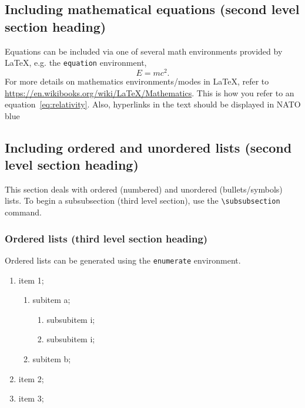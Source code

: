 \documentclass{nato-sto}
\begin{document}
\subsection{Including mathematical equations (second level section heading)	}

Equations can be included via one of several math environments provided by \LaTeX, e.g. the \verb|equation| environment,
\begin{equation}\label{eq:relativity}
E = mc^2.
\end{equation}
For more details on mathematics environments/modes in \LaTeX, refer to \url{https://en.wikibooks.org/wiki/LaTeX/Mathematics}. This is how you refer to an equation~\eqref{eq:relativity}. Also, hyperlinks in the text should be displayed in NATO blue 


\subsection{Including ordered and unordered lists (second level section heading)}

This section deals with ordered (numbered) and unordered (bullets/symbols) lists. To begin a subsubsection (third level section), use the \verb|\subsubsection| command.

\subsubsection{Ordered lists (third level section heading)}

Ordered lists can be generated using the \verb|enumerate| environment. 

\begin{enumerate}
\item item 1;
	\begin{enumerate}
		\item subitem a;
		\begin{enumerate}
			\item subsubitem i;
			\item subsubitem i;
		\end{enumerate}
		\item subitem b;
	\end{enumerate}
\item item 2;
\item item 3;
\end{enumerate}
\end{document}
